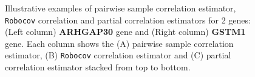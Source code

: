 \documentclass{bioinfo}
\def\Robocov{\texttt{Robocov}}
\begin{document}
\begin{figure}[!tpb]
\centering
{}
\caption{\small {{Illustrative examples of pairwise sample correlation estimator, \Robocov{} correlation and partial correlation estimators for 2 genes}:
(Left column)  \textbf{ARHGAP30} gene and (Right column) \textbf{GSTM1} gene. Each column shows the (A) pairwise sample correlation estimator, (B) \Robocov{} correlation estimator and  (C) partial correlation estimator stacked from top to bottom.}}
\label{fig:gtex_demo}
\end{figure}
\end{document}
